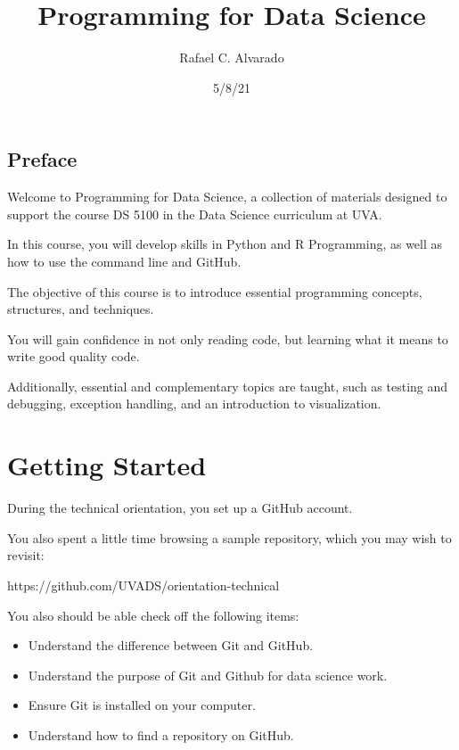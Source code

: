 \documentclass[
  letterpaper,
  DIV=11,
  numbers=noendperiod]{scrreport}
\title{Programming for Data Science}
\author{Rafael C. Alvarado}
\date{5/8/21}
\providecommand{\tightlist}{%
  \setlength{\itemsep}{0pt}\setlength{\parskip}{0pt}}\usepackage{longtable,booktabs,array}
\renewcommand*\contentsname{Table of contents}
\newcommand\contentsname{Table of contents}
\begin{document}
\maketitle
\ifdefined\Shaded\renewenvironment{Shaded}{\begin{tcolorbox}[boxrule=0pt, interior hidden, sharp corners, frame hidden, borderline west={3pt}{0pt}{shadecolor}, enhanced, breakable]}{\end{tcolorbox}}\fi

\renewcommand*\contentsname{Table of contents}
{
\hypersetup{linkcolor=}
\setcounter{tocdepth}{2}
\tableofcontents
}

\hypertarget{preface}{%
\chapter{Preface}\label{preface}}

Welcome to Programming for Data Science, a collection of materials
designed to support the course DS 5100 in the Data Science curriculum at
UVA.

In this course, you will develop skills in Python and R Programming, as
well as how to use the command line and GitHub.

The objective of this course is to introduce essential programming
concepts, structures, and techniques.

You will gain confidence in not only reading code, but learning what it
means to write good quality code.

Additionally, essential and complementary topics are taught, such as
testing and debugging, exception handling, and an introduction to
visualization.

\part{Getting Started}

During the technical orientation, you set up a GitHub account.

You also spent a little time browsing a sample repository, which you may
wish to revisit:

https://github.com/UVADS/orientation-technical

You also should be able check off the following items:

\begin{itemize}
\tightlist
\item
  Understand the difference between Git and GitHub.
\item
  Understand the purpose of Git and Github for data science work.
\item
  Ensure Git is installed on your computer.
\item
  Understand how to find a repository on GitHub.
\end{itemize}
\end{document}
